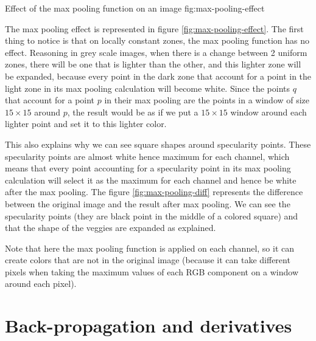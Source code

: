 \documentclass{article}
\begin{document}


\doublefig
{}
{}
{Effect of the max pooling function on an image} {fig:max-pooling-effect}

The max pooling effect is represented in figure \ref{fig:max-pooling-effect}.
The first thing to notice is that on locally constant zones, the max
pooling function has no effect. Reasoning in grey scale images, when
there is a change between 2 uniform zones, there will be one that is
lighter than the other, and this lighter zone will be expanded,
because every point in the dark zone that account for a point in the
light zone in its max pooling calculation will become white.  Since
the points $q$ that account for a point $p$ in their max pooling are
the points in a window of size $15 \times 15$ around $p$, the result
would be as if we put a $15 \times 15$ window around each lighter
point and set it to this lighter color.

This also explains why we can see square shapes around specularity
points. These specularity points are almost white hence maximum for
each channel, which means that every point accounting for a
specularity point in its max pooling calculation will select it as the
maximum for each channel and hence be white after the max pooling. The
figure \ref{fig:max-pooling-diff} represents the difference between
the original image and the result after max pooling. We can see the
specularity points (they are black point in the middle of a colored
square) and that the shape of the veggies are expanded as explained.

Note that here the max pooling function is applied on each channel, so
it can create colors that are not in the original image (because it
can take different pixels when taking the maximum values of each RGB
component on a window around each pixel).



\section{Back-propagation and derivatives}


\end{document}
